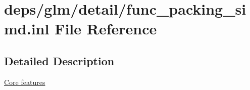 \hypertarget{func__packing__simd_8inl}{}\section{deps/glm/detail/func\+\_\+packing\+\_\+simd.inl File Reference}
\label{func__packing__simd_8inl}


\subsection{Detailed Description}
\hyperlink{group__core}{Core features} 